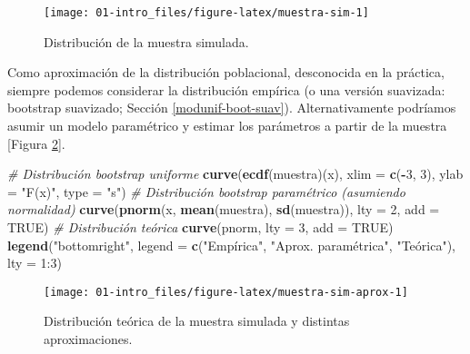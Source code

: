 \documentclass[]{book}
\newenvironment{Shaded}{\begin{snugshade}}{\end{snugshade}}
\newcommand{\KeywordTok}[1]{\textcolor[rgb]{0.13,0.29,0.53}{\textbf{#1}}}
\newcommand{\DataTypeTok}[1]{\textcolor[rgb]{0.13,0.29,0.53}{#1}}
\newcommand{\DecValTok}[1]{\textcolor[rgb]{0.00,0.00,0.81}{#1}}
\newcommand{\StringTok}[1]{\textcolor[rgb]{0.31,0.60,0.02}{#1}}
\newcommand{\CommentTok}[1]{\textcolor[rgb]{0.56,0.35,0.01}{\textit{#1}}}
\newcommand{\OtherTok}[1]{\textcolor[rgb]{0.56,0.35,0.01}{#1}}
\newcommand{\OperatorTok}[1]{\textcolor[rgb]{0.81,0.36,0.00}{\textbf{#1}}}
\newcommand{\NormalTok}[1]{#1}
\theoremstyle{break}
\theoremstyle{definition}
\theoremstyle{definition}
\theoremstyle{definition}
\theoremstyle{remark}
\begin{document}
\begin{figure}[!htb]

{\centering \texttt{[image: 01-intro\_files/figure-latex/muestra-sim-1]} 

}

\caption{Distribución de la muestra simulada.}\label{fig:muestra-sim}
\end{figure}

Como aproximación de la distribución poblacional, desconocida en la
práctica, siempre podemos considerar la distribución empírica (o una
versión suavizada: bootstrap suavizado; Sección
\ref{modunif-boot-suav}). Alternativamente podríamos asumir un modelo
paramétrico y estimar los parámetros a partir de la muestra {[}Figura
\ref{fig:muestra-sim-aprox}{]}.

\begin{Shaded}
\begin{Highlighting}[]
\CommentTok{# Distribución bootstrap uniforme}
\KeywordTok{curve}\NormalTok{(}\KeywordTok{ecdf}\NormalTok{(muestra)(x), }\DataTypeTok{xlim =} \KeywordTok{c}\NormalTok{(}\OperatorTok{-}\DecValTok{3}\NormalTok{, }\DecValTok{3}\NormalTok{), }\DataTypeTok{ylab =} \StringTok{"F(x)"}\NormalTok{, }\DataTypeTok{type =} \StringTok{"s"}\NormalTok{)}
\CommentTok{# Distribución bootstrap paramétrico (asumiendo normalidad)}
\KeywordTok{curve}\NormalTok{(}\KeywordTok{pnorm}\NormalTok{(x, }\KeywordTok{mean}\NormalTok{(muestra), }\KeywordTok{sd}\NormalTok{(muestra)), }\DataTypeTok{lty =} \DecValTok{2}\NormalTok{, }\DataTypeTok{add =} \OtherTok{TRUE}\NormalTok{)}
\CommentTok{# Distribución teórica}
\KeywordTok{curve}\NormalTok{(pnorm, }\DataTypeTok{lty =} \DecValTok{3}\NormalTok{, }\DataTypeTok{add =} \OtherTok{TRUE}\NormalTok{)}
\KeywordTok{legend}\NormalTok{(}\StringTok{"bottomright"}\NormalTok{, }\DataTypeTok{legend =} \KeywordTok{c}\NormalTok{(}\StringTok{"Empírica"}\NormalTok{, }\StringTok{"Aprox. paramétrica"}\NormalTok{, }\StringTok{"Teórica"), lty = 1:3)}
\end{Highlighting}
\end{Shaded}

\begin{figure}[!htb]

{\centering \texttt{[image: 01-intro\_files/figure-latex/muestra-sim-aprox-1]} 

}

\caption{Distribución teórica de la muestra simulada y distintas aproximaciones.}\label{fig:muestra-sim-aprox}
\end{figure}
\end{document}

